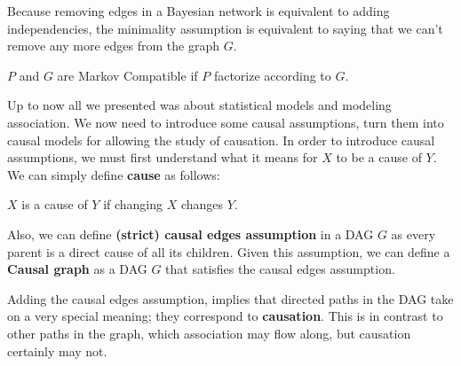 Because removing edges in a Bayesian network is equivalent to adding
independencies, the minimality assumption is equivalent to saying that we can't
remove any more edges from the graph $G$.

\begin{definition}
    $P$ and $G$ are Markov Compatible if $P$ factorize according to $G$. 
\end{definition}

Up to now all we presented was about statistical models and modeling association.
We now need to introduce some causal assumptions, turn them into causal models
for allowing the study of causation. In order to introduce causal assumptions,
we must first understand what it means for $X$ to be a cause of $Y$. We can simply
define \textbf{cause} as follows:
\begin{definition}
    $X$ is a cause of $Y$ if changing $X$ changes $Y$.
\end{definition}

Also, we can define \textbf{(strict) causal edges assumption} in a DAG $G$ as every parent
is a direct cause of all its children. Given this assumption, we can define a
\textbf{Causal graph} as a DAG $G$ that satisfies the causal edges assumption.

Adding the causal edges assumption, implies that directed paths in the DAG take
on a very special meaning; they correspond to \textbf{causation}. This is in
contrast to other paths in the graph, which association may flow along, but
causation certainly may not.
